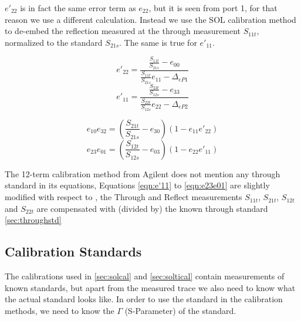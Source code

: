 $e'_{22}$ is in fact the same error term as $e_{22}$, but it is seen from port 1, for that reason we use a different calculation. Instead we use the SOL calibration method to de-embed the reflection measured at the through measurement $S_{11t}$, normalized to the standard $S_{21s}$. The same is true for $e'_{11}$. 

\begin{equation}
\label{eqn:e'22}
e'_{22} = \frac{\frac{S_{11t}}{S_{21s}}-e_{00}}{\frac{S_{11t}}{S_{21s}}e_{11}-\Delta_{eP1}}
\end{equation}
\begin{equation}
\label{eqn:e'11}
e'_{11} = \frac{\frac{S_{22t}}{S_{12s}}-e_{33}}{\frac{S_{22t}}{S_{12s}}e_{22}-\Delta_{eP2}}
\end{equation}

\begin{equation}
\label{eqn:e10e32}
e_{10}e_{32} = \left(\frac{S_{21t}}{S_{21s}} - e_{30}\right)\left(1-e_{11}e'_{22}\right)
\end{equation}
\begin{equation}
\label{eqn:e23e01}
e_{23}e_{01} = \left(\frac{S_{12t}}{S_{12s}} - e_{03}\right)\left(1-e_{22}e'_{11}\right)
\end{equation}

The 12-term calibration method from Agilent \cite{agilent_calibration} does not mention any through standard in its equations, Equations \ref{eqn:e'11} to \ref{eqn:e23e01} are slightly modified with respect to \cite{agilent_calibration}, the Through and Reflect measurements $S_{11t}$, $S_{21t}$, $S_{12t}$ and $S_{22t}$ are compensated with (divided by) the known through standard \ref{sec:throughstd}


\subsection{Calibration Standards}
\label{sec:calstds}

The calibrations used in \ref{sec:solcal} and \ref{sec:soltical} contain measurements of known standards, but apart from the measured trace we also need to know what the actual standard looks like. In order to use the standard in the calibration methods, we need to know the $\Gamma$ (S-Parameter) of the standard.
